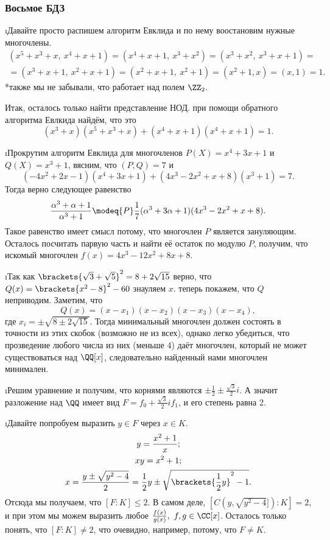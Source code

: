 \subsubsection{Восьмое БДЗ}

\i Давайте просто распишем алгоритм Евклида и по нему воостановим нужные многочлены.
\begin{gather*}
    (x^5 + x^3 + x,\ x^4 + x + 1) = (x^4 + x + 1,\ x^3 + x^2) = (x^3 + x^2,\ x^3 + x + 1) = \\ =
    (x^3 + x + 1,\ x^2 + x + 1) = (x^2 + x + 1,\ x^2 + 1) = (x^2 + 1, x) = (x, 1) = 1.
\end{gather*}
*также мы не забывали, что работает над полем $\ZZ_2$.
\par Итак, осталось только найти представление НОД. при помощи обратного алгоритма Евлкида найдём, что это 
$$
    (x^3 + x)(x^5 + x^3 + x) + (x^4 + x + 1)(x^4 + x + 1) = 1.
$$


\i Прокрутим алгоритм Евклида для многочленов $P(X) = x^4 + 3x + 1$ и $Q(X) = x^3 + 1$, вясним, что $(P, Q) = 7$ и 
$$
    (-4x^2 + 2x - 1)(x^4 + 3x + 1) + (4x^3 - 2x^2 + x + 8)(x^3 + 1) = 7.
$$
Тогда верно следующее равенство
$$
    \frac{\alpha^3 + \alpha + 1}{\alpha^3 + 1} \modeq{P} \frac{1}{7}(\alpha^3 + 3\alpha + 1)(4x^3 - 2x^2 + x + 8).
$$
Такое равенство имеет смысл потому, что многочлен $P$ является зануляющим. Осталось посчитать парвую часть и найти её остаток по модулю $P$, получим, что искомый многочлен $f(x) = 4x^3 - 12x^2 + 8x + 8$.


\i Так как $\brackets{\sqrt{3}+\sqrt{5}}^2 = 8 + 2\sqrt{15}$ верно, что $Q(x) = \brackets{x^2 - 8}^2 - 60$ знауляем $x$. теперь покажем, что $Q$ неприводим. Заметим, что 
$$
    Q(x) = (x - x_1)(x-x_2)(x-x_3)(x-x_4),
$$
где $x_i = \pm\sqrt{8 \pm 2\sqrt{15}}$. Тогда минимальный многочлен должен состоять в точности из этих скобок (возможно не из всех), однако легко убедиться, что прозведение любого числа из них (меньше 4) даёт многочлен, который не может существоваться над $\QQ[x]$, следовательно найденный нами многочлен минимален.


\i Решим уравнение и получим, что корнями являются $\pm\frac{1}{2} \pm \frac{\sqrt{3}}{2}i$. А значит разложение над $\QQ$ имеет вид $F = f_0 + \frac{\sqrt{3}}{2}if_1$, и его степень равна 2.


\i Давайте попробуем выразить $y \in F$ через $x \in K$.
\begin{gather*}
    y = \frac{x^2 + 1}{x};\\
    xy = x^2 + 1;\\
    x = \frac{y \pm \sqrt{y^2 - 4}}{2} = \frac{1}{2}y \pm \sqrt{\brackets{\frac{1}{2}y}^2 - 1}.
\end{gather*}
Отсюда мы получаем, что $[F : K] \leq 2$. В самом деле, $[C(y, \sqrt{y^2 - 4}]) : K] = 2$, и при этом мы можем выразить любое $\frac{f(x)}{g(x)},\ f, g \in \CC[x]$. Осталось только понять, что $[F : K] \ne 2$, что очевидно, например, потому, что $F \ne K$.
